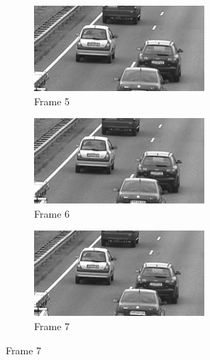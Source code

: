 \documentclass{article}
\begin{document}
\begin{enumerate}
\begin{figure}[h!]
    \vskip 0.2cm
    \begin{subfigure}{0.32\textwidth}
        \centering
        \includegraphics[width=\linewidth]{../images/cars/frame = 5.png}
        \caption{Frame 5}
    \end{subfigure}
    \begin{subfigure}{0.32\textwidth}
        \centering
        \includegraphics[width=\linewidth]{../images/cars/frame = 6.png}
        \caption{Frame 6}
    \end{subfigure}
    \begin{subfigure}{0.32\textwidth}
        \centering
        \includegraphics[width=\linewidth]{../images/cars/frame = 7.png}
        \caption{Frame 7}
    \end{subfigure}


\end{figure}
\end{enumerate}
\end{document}
